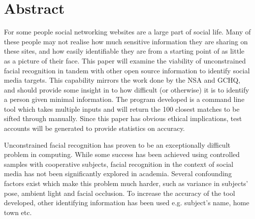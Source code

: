 \documentclass{article}
\begin{document}
\section{Abstract}
For some people social networking websites are a large part of social life. Many of these people may not realise how much sensitive information they are sharing on these sites, and how easily identifiable they are from a starting point of as little as a picture of their face. This paper will examine the viability of unconstrained facial recognition in tandem with other open source information to identify social media targets. This capability mirrors the work done by the NSA and GCHQ, and should provide some insight in to how difficult (or otherwise) it is to identify a person given minimal information. The program developed is a command line tool which takes multiple inputs and will return the 100 closest matches to be sifted through manually. Since this paper has obvious ethical implications, test accounts will be generated to provide statistics on accuracy. 

Unconstrained facial recognition has proven to be an exceptionally difficult problem in computing. While some success has been achieved using controlled samples with cooperative subjects, facial recognition in the context of social media has not been significantly explored in academia. Several confounding factors exist which make this problem much harder, such as variance in subjects' pose, ambient light and facial occlusion. To increase the accuracy of the tool developed, other identifying information has been used e.g. subject's name, home town etc.
\end{document}
